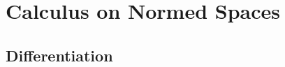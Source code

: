 \documentclass[crop=false,class=article,oneside]{standalone}
\begin{document}
    \ifx\ifworkmasterswork\undefined
        \section*{Calculus on Normed Spaces}
        \setcounter{section}{1}
    \fi
    \subsection{Differentiation}
\end{document}
